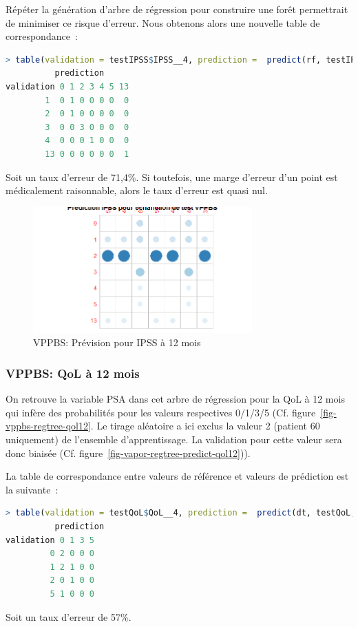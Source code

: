 Répéter la génération d'arbre de régression pour construire une forêt permettrait de
minimiser ce risque d'erreur. Nous obtenons alors une nouvelle table de correspondance~:

\begin{lstlisting}[language=R]
> table(validation = testIPSS$IPSS__4, prediction =  predict(rf, testIPSS))
          prediction
validation 0 1 2 3 4 5 13
        1  0 1 0 0 0 0  0
        2  0 1 0 0 0 0  0
        3  0 0 3 0 0 0  0
        4  0 0 0 1 0 0  0
        13 0 0 0 0 0 0  1
\end{lstlisting}
Soit un taux d'erreur de 71,4\%. Si toutefois, une marge d'erreur d'un point est médicalement raisonnable, alors le taux d'erreur est quasi nul.

\begin{figure}[H]
\centering
\includegraphics[width=0.75\textwidth]{../Fig/VPPBS/vppbs-regtree-predict-ipss12.png}
\caption{VPPBS: Prévision pour IPSS à 12 mois}
\label{fig-vppbs-regtree-predict-ipss12}
\end{figure}

\subsubsection{VPPBS: QoL à 12 mois}

On retrouve la variable PSA dans cet arbre de régression pour la QoL à 12 mois
qui infère des probabilités pour les valeurs respectives 0/1/3/5 (Cf. figure~\ref{fig-vppbs-regtree-qol12}. Le tirage aléatoire a ici exclus la valeur 2
(patient 60 uniquement) de l'ensemble d'apprentissage. La validation pour cette
valeur sera donc biaisée (Cf. figure~\ref{fig-vapor-regtree-predict-qol12})).

La table de correspondance entre valeurs de référence et valeurs de prédiction est la suivante~:
\begin{lstlisting}[language=R]
> table(validation = testQoL$QoL__4, prediction =  predict(dt, testQoL, type="class"))
          prediction
validation 0 1 3 5
         0 2 0 0 0
         1 2 1 0 0
         2 0 1 0 0
         5 1 0 0 0
\end{lstlisting}
Soit un taux d'erreur de 57\%.


